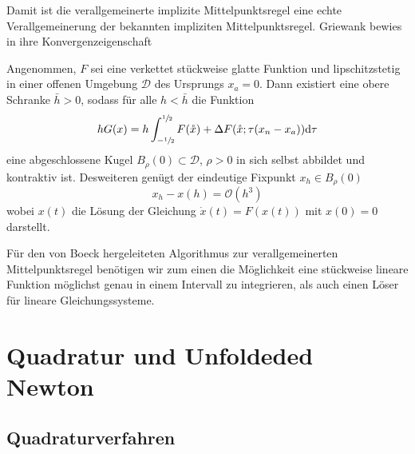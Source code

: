 Damit ist die verallgemeinerte implizite Mittelpunktsregel eine echte Verallgemeinerung der bekannten impliziten Mittelpunktsregel. 
Griewank bewies in \cite[Prop.4]{monster} ihre Konvergenzeigenschaft
\begin{theorem}
\label{thm:convergenceGenMidpoint}
 Angenommen, $F$ sei eine verkettet stückweise glatte Funktion und lipschitzstetig in einer offenen Umgebung $\mathcal D$ des Ursprungs $x_a =0$. Dann existiert eine obere Schranke $\bar h>0$, sodass für alle $h<\bar h$ die Funktion 
 \[
    hG(x) = h\int_{-\sfrac{1}{2}}^{\sfrac{1}{2}} F(\mathring{x}) + \Delta F(\mathring{x};\tau (x_n - x_a))  \text{d}\tau
 \] 
 eine abgeschlossene Kugel $B_\rho(0)\subset \mathcal D$, $\rho>0$ in sich selbst abbildet und kontraktiv ist.
 Desweiteren genügt der eindeutige Fixpunkt $x_h\in B_\rho(0)$
 \[
  x_h - x(h) = \mathcal O(h^3)
 \]
  wobei $x(t)$ die Lösung der Gleichung $\dot x(t) = F(x(t))$ mit  $x(0)= 0$ darstellt.
\end{theorem}

Für den von Boeck \cite{boeck14} hergeleiteten Algorithmus zur verallgemeinerten Mittelpunktsregel benötigen wir zum einen die Möglichkeit eine stückweise lineare Funktion möglichst genau in einem Intervall zu integrieren, als auch einen Löser für lineare Gleichungssysteme.
\vfill
\section{Quadratur und Unfoldeded Newton}
\subsection{Quadraturverfahren}

